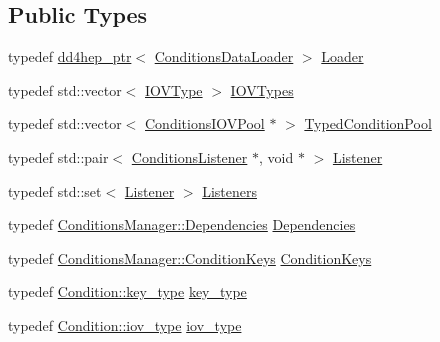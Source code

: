 \subsection*{Public Types}
\begin{DoxyCompactItemize}
\item 
typedef \hyperlink{class_d_d4hep_1_1dd4hep__ptr}{dd4hep\_\-ptr}$<$ \hyperlink{class_d_d4hep_1_1_conditions_1_1_conditions_data_loader}{ConditionsDataLoader} $>$ \hyperlink{class_d_d4hep_1_1_conditions_1_1_conditions_manager_object_ab2df3fc6386b7f71ed3087271d90acc6}{Loader}
\item 
typedef std::vector$<$ \hyperlink{class_d_d4hep_1_1_i_o_v_type}{IOVType} $>$ \hyperlink{class_d_d4hep_1_1_conditions_1_1_conditions_manager_object_a8c3b7d5bdfb7fc6bf6e61ddba5a5f652}{IOVTypes}
\item 
typedef std::vector$<$ \hyperlink{class_d_d4hep_1_1_conditions_1_1_conditions_i_o_v_pool}{ConditionsIOVPool} $\ast$ $>$ \hyperlink{class_d_d4hep_1_1_conditions_1_1_conditions_manager_object_a1617c134372fbb79d06990707f19bb0c}{TypedConditionPool}
\item 
typedef std::pair$<$ \hyperlink{class_d_d4hep_1_1_conditions_1_1_conditions_listener}{ConditionsListener} $\ast$, void $\ast$ $>$ \hyperlink{class_d_d4hep_1_1_conditions_1_1_conditions_manager_object_ac4cd1e3a448bc1f8bae384d194f10c23}{Listener}
\item 
typedef std::set$<$ \hyperlink{class_d_d4hep_1_1_conditions_1_1_conditions_manager_object_ac4cd1e3a448bc1f8bae384d194f10c23}{Listener} $>$ \hyperlink{class_d_d4hep_1_1_conditions_1_1_conditions_manager_object_aba0162524bc90a39e30bd5f1f0067ee2}{Listeners}
\item 
typedef \hyperlink{class_d_d4hep_1_1_conditions_1_1_conditions_dependency_collection}{ConditionsManager::Dependencies} \hyperlink{class_d_d4hep_1_1_conditions_1_1_conditions_manager_object_a539905074db3aee8b401d575649dbdd8}{Dependencies}
\item 
typedef \hyperlink{class_d_d4hep_1_1_conditions_1_1_conditions_manager_a8dd76f9acef2c8d3b7970e266fe7eff6}{ConditionsManager::ConditionKeys} \hyperlink{class_d_d4hep_1_1_conditions_1_1_conditions_manager_object_aad75140018040c6ad49e56a4d56a35ee}{ConditionKeys}
\item 
typedef \hyperlink{class_d_d4hep_1_1_conditions_1_1_condition_a7528efa762e8cc072ef80ea67c3531f9}{Condition::key\_\-type} \hyperlink{class_d_d4hep_1_1_conditions_1_1_conditions_manager_object_ac44eafc69174743e81d2f60e1f510719}{key\_\-type}
\item 
typedef \hyperlink{class_d_d4hep_1_1_i_o_v}{Condition::iov\_\-type} \hyperlink{class_d_d4hep_1_1_conditions_1_1_conditions_manager_object_a0190ec510ca46da4a1cc908ac3c3a1dd}{iov\_\-type}
\end{DoxyCompactItemize}
